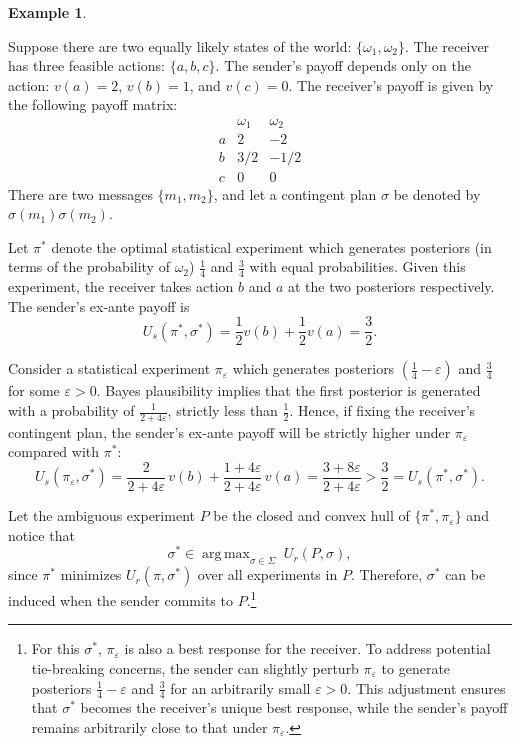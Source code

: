 \documentclass[12pt,a4paper]{article}
\theoremstyle{definition}
\newtheorem{example}{Example}[section]
\theoremstyle{remark}
\newenvironment{original}{%
    \par\medskip\noindent%
    \begin{tcolorbox}[%
        colback=white,%
        colframe=black!50,%
        title=\textbf{Original English},%
        fonttitle=\small\bfseries,%
        left=0pt, right=0pt, top=2pt, bottom=2pt,%
        boxrule=0.5pt,%
        arc=0pt,%
        outer arc=0pt%
    ]%
    \small%
}{%
    \end{tcolorbox}%
}
\DeclareMathOperator{\argmax}{arg\,max}
\begin{document}
\begin{example}\label{ex:2}
\begin{original}
Suppose there are two equally likely states of the world: $\{\omega_1, \omega_2\}$. The receiver has three feasible actions: $\{a, b, c\}$. The sender's payoff depends only on the action: $v(a) = 2$, $v(b) = 1$, and $v(c) = 0$. The receiver's payoff is given by the following payoff matrix:
\[
\begin{array}{c|cc}
 & \omega_1 & \omega_2 \\
\hline
a & 2 & -2 \\
b & 3/2 & -1/2 \\
c & 0 & 0
\end{array}
\]
There are two messages $\{m_1, m_2\}$, and let a contingent plan $\sigma$ be denoted by $\sigma(m_1)\sigma(m_2)$.

Let $\pi^*$ denote the optimal statistical experiment which generates posteriors (in terms of the probability of $\omega_2$) $\frac{1}{4}$ and $\frac{3}{4}$ with equal probabilities. Given this experiment, the receiver takes action $b$ and $a$ at the two posteriors respectively. The sender's ex-ante payoff is
\[
U_s(\pi^*, \sigma^*) = \frac{1}{2} v(b) + \frac{1}{2} v(a) = \frac{3}{2}.
\]

Consider a statistical experiment $\pi_\varepsilon$ which generates posteriors $(\frac{1}{4} - \varepsilon)$ and $\frac{3}{4}$ for some $\varepsilon > 0$. Bayes plausibility implies that the first posterior is generated with a probability of $\frac{1}{2+4\varepsilon}$, strictly less than $\frac{1}{2}$. Hence, if fixing the receiver's contingent plan, the sender's ex-ante payoff will be strictly higher under $\pi_\varepsilon$ compared with $\pi^*$:
\[
U_s(\pi_\varepsilon, \sigma^*) = \frac{2}{2+4\varepsilon} \, v(b) + \frac{1+4\varepsilon}{2+4\varepsilon} \, v(a) = \frac{3+8\varepsilon}{2+4\varepsilon} > \frac{3}{2} = U_s(\pi^*, \sigma^*).
\]

Let the ambiguous experiment $P$ be the closed and convex hull of $\{\pi^*, \pi_\varepsilon\}$ and notice that
\[
\sigma^* \in \argmax_{\sigma \in \Sigma} \; U_r(P, \sigma),
\]
since $\pi^*$ minimizes $U_r(\pi, \sigma^*)$ over all experiments in $P$. Therefore, $\sigma^*$ can be induced when the sender commits to $P$.\footnote{For this $\sigma^*$, $\pi_\varepsilon$ is also a best response for the receiver. To address potential tie-breaking concerns, the sender can slightly perturb $\pi_\varepsilon$ to generate posteriors $\frac{1}{4} - \varepsilon$ and $\frac{3}{4}$ for an arbitrarily small $\varepsilon > 0$. This adjustment ensures that $\sigma^*$ becomes the receiver's unique best response, while the sender's payoff remains arbitrarily close to that under $\pi_\varepsilon$.}


\end{original}
\end{example}
\end{document}

